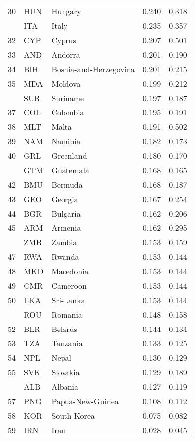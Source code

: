 \begin{table}
\begin{tabular}[t]{rllrr}
30 & HUN & Hungary & 0.240 & 0.318\\
\addlinespace
31 & ITA & Italy & 0.235 & 0.357\\
32 & CYP & Cyprus & 0.207 & 0.501\\
33 & AND & Andorra & 0.201 & 0.190\\
34 & BIH & Bosnia-and-Herzegovina & 0.201 & 0.215\\
35 & MDA & Moldova & 0.199 & 0.212\\
\addlinespace
36 & SUR & Suriname & 0.197 & 0.187\\
37 & COL & Colombia & 0.195 & 0.191\\
38 & MLT & Malta & 0.191 & 0.502\\
39 & NAM & Namibia & 0.182 & 0.173\\
40 & GRL & Greenland & 0.180 & 0.170\\
\addlinespace
41 & GTM & Guatemala & 0.168 & 0.165\\
42 & BMU & Bermuda & 0.168 & 0.187\\
43 & GEO & Georgia & 0.167 & 0.254\\
44 & BGR & Bulgaria & 0.162 & 0.206\\
45 & ARM & Armenia & 0.162 & 0.295\\
\addlinespace
46 & ZMB & Zambia & 0.153 & 0.159\\
47 & RWA & Rwanda & 0.153 & 0.144\\
48 & MKD & Macedonia & 0.153 & 0.144\\
49 & CMR & Cameroon & 0.153 & 0.144\\
50 & LKA & Sri-Lanka & 0.153 & 0.144\\
\addlinespace
51 & ROU & Romania & 0.148 & 0.158\\
52 & BLR & Belarus & 0.144 & 0.134\\
53 & TZA & Tanzania & 0.133 & 0.125\\
54 & NPL & Nepal & 0.130 & 0.129\\
55 & SVK & Slovakia & 0.129 & 0.189\\
\addlinespace
56 & ALB & Albania & 0.127 & 0.119\\
57 & PNG & Papua-New-Guinea & 0.108 & 0.112\\
58 & KOR & South-Korea & 0.075 & 0.082\\
59 & IRN & Iran & 0.028 & 0.045\\
\bottomrule
\end{tabular}
\end{table}